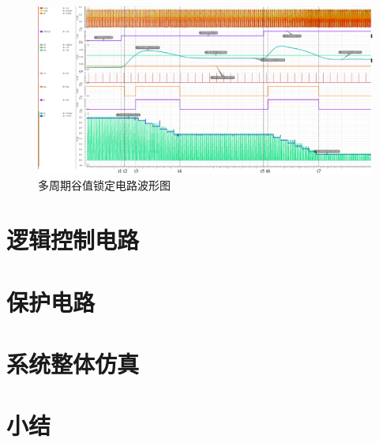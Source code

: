 \begin{figure}[htbp] 
    \centering
    \includegraphics[width=0.8\linewidth]{figures/valley_lock1.pdf}
    \caption{多周期谷值锁定电路波形图}
    \label{fig:多周期谷值锁定电路波形图}
\end{figure} 

\section{逻辑控制电路}

\section{保护电路}

\section{系统整体仿真}

\section{小结}




